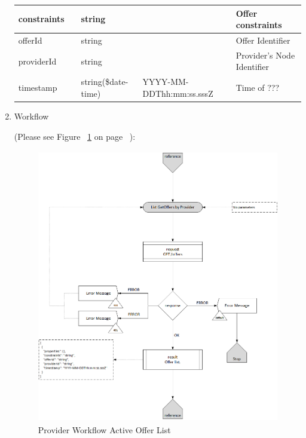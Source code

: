 \begin{enumerate}
\begin{center}
\begin{tabular}{|p{3cm}|l|p{3cm}|p{3cm}|p{4cm}|}
\hline

constraints	& 	& 	string	&		&	Offer constraints \\ 

\hline

offerId		&	&	string	&		& 	Offer Identifier \\

\hline

providerId  & 	&	string	&		&	Provider's Node Identifier \\

\hline

timestamp	&	& 	string(\$date-time)	& YYYY-MM-DDThh:mm:ss.sssZ	&	Time of ???  \\ 

\hline

\end{tabular}
\end{center}


\item Workflow

(Please see Figure ~\ref{fig:LO} on page ~\pageref{fig:LO}):

\begin{figure}[htbp]
    \centering
    \includegraphics[width=12cm,height=12cm,angle=0]{./diag/Workflow/Market/List(GetOffers)-P-Workflow.png}
    \caption{Provider Workflow Active Offer List }
	\label{fig:LO}
\end{figure}


\end{enumerate}

